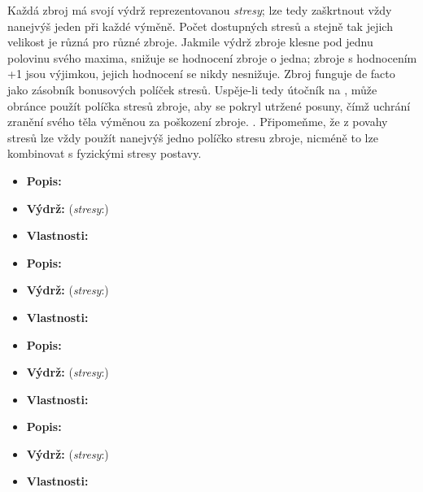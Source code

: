 \documentclass[../main.tex]{subfiles}
\begin{document}
\begin{Real}[Zbraně]
	Každá zbroj má svojí výdrž reprezentovanou \emph{stresy}; lze tedy zaškrtnout vždy nanejvýš jeden při každé výměně. Počet dostupných stresů a stejně tak jejich velikost je různá pro různé zbroje. Jakmile výdrž zbroje klesne pod jednu polovinu svého maxima, snižuje se hodnocení zbroje o jedna; zbroje s hodnocením +1 jsou výjimkou, jejich hodnocení se nikdy nesnižuje. 
	Zbroj funguje de facto jako zásobník bonusových políček stresů. Uspěje-li tedy útočník na , může obránce použít políčka stresů zbroje, aby se pokryl utržené posuny, čímž uchrání zranění svého těla výměnou za poškození zbroje. . Připomeňme, že z povahy stresů lze vždy použít nanejvýš jedno políčko stresu zbroje, nicméně to lze kombinovat s fyzickými stresy postavy.
\end{Real}

\begin{Predmet}
\begin{itemize}
	\item \textbf{Popis:} 
	\item \textbf{Výdrž:} (\emph{stresy}:) 
	\item \textbf{Vlastnosti:} 
\end{itemize}
\end{Predmet}


\begin{Predmet}
\begin{itemize}
	\item \textbf{Popis:} 
	\item \textbf{Výdrž:} (\emph{stresy}:) 
	\item \textbf{Vlastnosti:} 
\end{itemize}
\end{Predmet}

\begin{Predmet}
\begin{itemize}
	\item \textbf{Popis:} 
	\item \textbf{Výdrž:} (\emph{stresy}:) 
	\item \textbf{Vlastnosti:} 
\end{itemize}
\end{Predmet}


\begin{Predmet}
\begin{itemize}
	\item \textbf{Popis:} 
	\item \textbf{Výdrž:} (\emph{stresy}:) 
	\item \textbf{Vlastnosti:} 
\end{itemize}
\end{Predmet}
\end{document}
